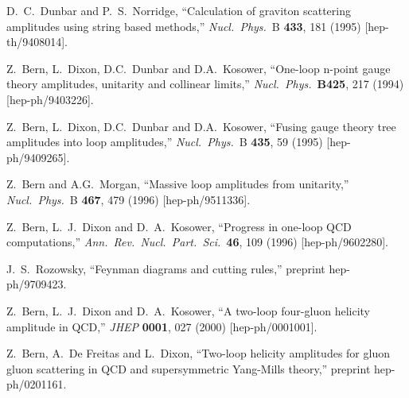 \begin{thebibliography}{99}
D.~C.~Dunbar and P.~S.~Norridge,
``Calculation of graviton scattering amplitudes using string based methods,''
{\it Nucl.\ Phys.}\ B {\bf 433}, 181 (1995)
[hep-th/9408014].

Z.~Bern, L.~Dixon, D.C.~Dunbar and D.A.~Kosower,
``One-loop n-point gauge theory amplitudes, unitarity 
and collinear limits,''
{\it Nucl.\ Phys.}\ {\bf B425}, 217 (1994)
[hep-ph/9403226].

Z.~Bern, L.~Dixon, D.C.~Dunbar and D.A.~Kosower,
``Fusing gauge theory tree amplitudes into loop amplitudes,''
{\it Nucl.\ Phys.}\ B {\bf 435}, 59 (1995)
[hep-ph/9409265].

Z.~Bern and A.G.~Morgan,
``Massive loop amplitudes from unitarity,''
{\it Nucl.\ Phys.}\ B {\bf 467}, 479 (1996)
[hep-ph/9511336].

Z.~Bern, L.~J.~Dixon and D.~A.~Kosower,
``Progress in one-loop QCD computations,''
{\it Ann.\ Rev.\ Nucl.\ Part.\ Sci.}\  {\bf 46}, 109 (1996)
[hep-ph/9602280].

J.~S.~Rozowsky,
``Feynman diagrams and cutting rules,''
preprint hep-ph/9709423.

Z.~Bern, L.~J.~Dixon and D.~A.~Kosower,
``A two-loop four-gluon helicity amplitude in QCD,''
{\it JHEP} {\bf 0001}, 027 (2000)
[hep-ph/0001001].

Z.~Bern, A.~De Freitas and L.~Dixon,
``Two-loop helicity amplitudes for gluon gluon scattering in QCD and 
supersymmetric Yang-Mills theory,''
preprint hep-ph/0201161.


\end{thebibliography}
